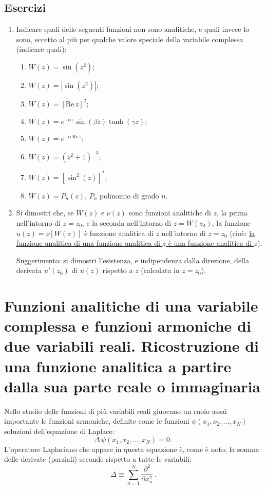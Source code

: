 \documentclass[11pt, a4paper]{book}
\numberwithin{equation}{section}
\newenvironment{esercizi}{\subsection*{Esercizi}\begin{enumerate}}{\end{enumerate}}
\begin{document}

\begin{esercizi}
\item Indicare quali delle seguenti funzioni non sono analitiche, e quali invece lo sono, eccetto al più per qualche valore speciale della variabile complessa (indicare quali):
\begin{enumerate}
\renewcommand{\theenumi}{\roman{enumi}}
\item $W(z) = \sin(z^2)$;
\item $W(z) = |\sin(z^2)|$;
\item $W(z) = [\mathrm{Re}\,z]^2$;
\item $W(z) = e^{-\alpha z}\sin(\beta z)\tanh(\gamma z)$;
\item $W(z) = e^{-\alpha\,\mathrm{Re}\,z}$;
\item $W(z) = (z^2+1)^{-3}$;
\item $W(z) = [\sin^2(z)]^*$;
\item $W(z) = P_n(z)$, $P_n$ polinomio di grado $n$.
\end{enumerate}
\item Si dimostri che, se $W(z)$ e $\nu(z)$ sono funzioni analitiche di $z$, la prima nell'intorno di $z = z_0$, e la seconda nell'intorno di $z = W(z_0)$, la funzione $u(z) = \nu[W(z)]$ è funzione analitica di $z$ nell'intorno di $z = z_0$ (cioè: \uline{la funzione analitica di una funzione analitica di $z$ è una funzione analitica di $z$}).

Suggerimento: si dimostri l'esistenza, e indipendenza dalla direzione, della derivata $u'(z_0)$ di $u(z)$ rispetto a $z$ (calcolata in $z = z_0$).
\end{esercizi}

\section[funzioni analitiche di 1 variabile complessa e armoniche di 2 variabili reali]{Funzioni analitiche di una variabile complessa e funzioni armoniche di due variabili reali. Ricostruzione di una funzione analitica a partire dalla sua parte reale o immaginaria}

Nello studio delle funzioni di più variabili reali giuocano un ruolo assai importante le funzioni armoniche, definite come le funzioni $\psi(x_1, x_2, \ldots, x_N)$ soluzioni dell'equazione di Laplace:
\begin{equation}
\Delta\,\psi(x_1, x_2, \ldots, x_N) = 0\,. \tag{1}
\end{equation}
L'operatore Laplaciano che appare in questa equazione è, come è noto, la somma delle derivate (parziali) seconde rispetto a tutte le variabili:
\begin{equation}
\Delta \equiv \sum_{n=1}^{N} \frac{\partial^2}{\partial x_n^2}\,. \tag{2}
\end{equation}
\end{document}
